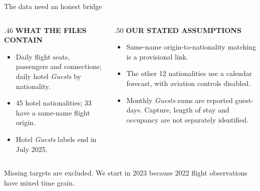 \documentclass[aspectratio=169,10pt]{beamer}
\newcommand{\kicker}[1]{{\color{Accent}\scriptsize\bfseries\MakeUppercase{#1}}\par\vspace{.16cm}}
\newcommand{\smallnote}[1]{{\color{Muted}\scriptsize #1}}
\begin{document}
\begin{frame}{The data need an honest bridge}
  \begin{columns}[T,totalwidth=\linewidth]
    \begin{column}{.46\linewidth}
      \kicker{What the files contain}
      \begin{itemize}\setlength\itemsep{.14cm}
        \item Daily flight seats, passengers and connections; daily hotel \emph{Guests} by nationality.
        \item 45 hotel nationalities; 33 have a same-name flight origin.
        \item Hotel \emph{Guests} labels end in July 2025.
      \end{itemize}
    \end{column}
    \begin{column}{.50\linewidth}
      \kicker{Our stated assumptions}
      \begin{itemize}\setlength\itemsep{.14cm}
        \item Same-name origin-to-nationality matching is a provisional link.
        \item The other 12 nationalities use a calendar forecast, with aviation controls disabled.
        \item Monthly \emph{Guests} sums are reported guest-days. Capture, length of stay and occupancy are not separately identified.
      \end{itemize}
    \end{column}
  \end{columns}
  \vspace{.18cm}
  \smallnote{Missing targets are excluded. We start in 2023 because 2022 flight observations have mixed time grain.}
\end{frame}
\end{document}
